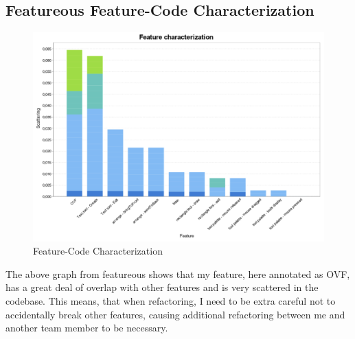 \subsection{Featureous Feature-Code Characterization}
\begin{figure}[H]
    \includegraphics[width=\textwidth]{Images/featurecharacterization.png}
    \caption{Feature-Code Characterization}
\end{figure}
The above graph from featureous shows that my feature, here annotated as OVF, has a great deal of overlap with other features and is very scattered in the codebase. This means, that when refactoring, I need to be extra careful not to accidentally break other features, causing additional refactoring between me and another team member to be necessary.

